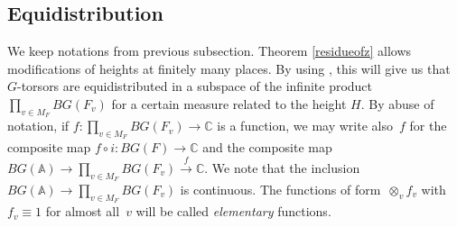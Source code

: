 \documentclass[a4paper,english,12pt]{amsart}
\newcommand{\CC}{\mathbb{C}}
\newcommand{\vMF}{v\in M_F}
\newcommand{\AAA}{\mathbb A}
\numberwithin{equation}{subsection}
\begin{document}
\subsection{Equidistribution}\label{secequid}  We keep notations from previous subsection. Theorem \ref{residueofz} allows modifications of heights at finitely many places. By using \cite[Proposition 2.10]{Igusa}, this will give us that $G$-torsors are equidistributed in a subspace of the infinite product $\prod_{v\in M_F}BG(F_v)$ for a certain measure related to the height $H$.
 By abuse of notation, if $f:\prod_{\vMF}BG(F_v)\to \CC$ is a function, we may write also~$f$ for the composite map $f\circ i:BG(F)\to\CC$ and the composite map $BG(\AAA)\to \prod_{\vMF}BG(F_v)\xrightarrow{f}\CC$. We note that the inclusion $BG(\AAA)\to \prod_{\vMF}BG(F_v)$ is continuous. The functions of form~$\otimes_v f_v$ with~$f_v\equiv 1$ for almost all~$v$ will be called {\it elementary} functions.
\end{document}
